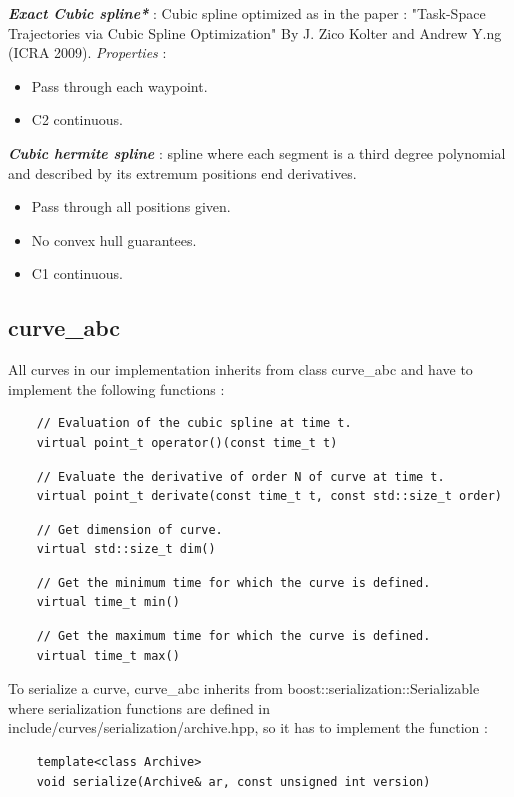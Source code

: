 \documentclass{article}
\begin{document}
    \noindent
    \textbf{\textit{Exact Cubic spline*}} : Cubic spline optimized as in the paper : "Task-Space Trajectories via Cubic Spline Optimization" By J. Zico Kolter and Andrew Y.ng (ICRA 2009). \textit{Properties} :
     \begin{itemize}
        \item Pass through each waypoint.
        \item C2 continuous.
    \end{itemize}
    
    \noindent
    \textbf{\textit{Cubic hermite spline}} : spline where each segment is a third degree polynomial and described by its extremum positions end derivatives.
    \begin{itemize}
        \item Pass through all positions given.
        \item No convex hull guarantees.
        \item C1 continuous.
    \end{itemize}
    
\subsection{curve\_abc}
    All curves in our implementation inherits from class curve\_abc and have to implement the following functions :\\
    \begin{lstlisting}
    // Evaluation of the cubic spline at time t.
    virtual point_t operator()(const time_t t)
    \end{lstlisting}
    \begin{lstlisting}
    // Evaluate the derivative of order N of curve at time t.
    virtual point_t derivate(const time_t t, const std::size_t order)
    \end{lstlisting}
    \begin{lstlisting}
    // Get dimension of curve.
    virtual std::size_t dim()
    \end{lstlisting}
    \begin{lstlisting}
    // Get the minimum time for which the curve is defined.
    virtual time_t min()
    \end{lstlisting}
    \begin{lstlisting}
    // Get the maximum time for which the curve is defined.
    virtual time_t max()
    \end{lstlisting}
    
    To serialize a curve, curve\_abc inherits from boost::serialization::Serializable where serialization functions are defined in include/curves/serialization/archive.hpp, so it has to implement the function :
    \begin{lstlisting}
    template<class Archive>
    void serialize(Archive& ar, const unsigned int version)
    \end{lstlisting}
\end{document}
